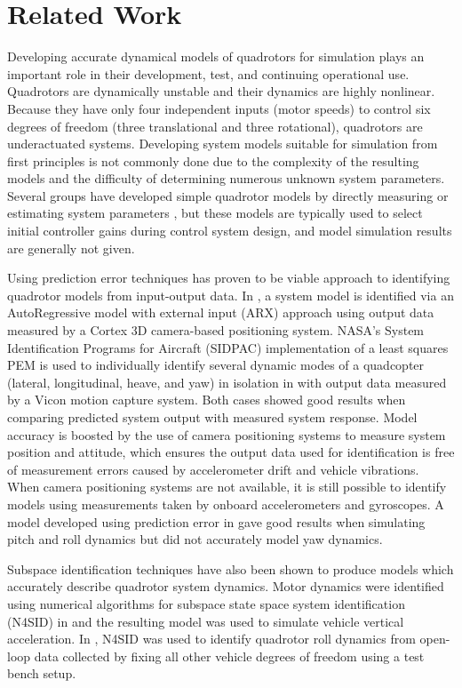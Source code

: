 \section{Related Work}
Developing accurate dynamical models of quadrotors for simulation plays an important role in their development, test, and continuing operational use. Quadrotors are dynamically unstable and their dynamics are highly nonlinear. Because they have only four independent inputs (motor speeds) to control six degrees of freedom (three translational and three rotational), quadrotors are underactuated systems. Developing system models suitable for simulation from first principles is not commonly done due to the complexity of the resulting models and the difficulty of determining numerous unknown system parameters. Several groups have developed simple quadrotor models by directly measuring or estimating system parameters \cite{bresciani2008modelling, domingues2009quadrotor, kivrak2006design, pounds2006modelling, schreier2012modeling}, but these models are typically used to select initial controller gains during control system design, and model simulation results are generally not given. 

Using prediction error techniques has proven to be viable approach to identifying quadrotor models from input-output data. In \cite{chamberlain2011system}, a system model is identified via an AutoRegressive model with external input (ARX) approach using output data measured by a Cortex 3D camera-based positioning system. NASA's System Identification Programs for Aircraft (SIDPAC) implementation of a least squares PEM is used to individually identify several dynamic modes of a quadcopter (lateral, longitudinal, heave, and yaw) in isolation in \cite{miller2011open} with output data measured by a Vicon motion capture system. Both cases showed good results when comparing predicted system output with measured system response. Model accuracy is boosted by the use of camera positioning systems to measure system position and attitude, which ensures the output data used for identification is free of measurement errors caused by accelerometer drift and vehicle vibrations. When camera positioning systems are not available, it is still possible to identify models using measurements taken by onboard accelerometers and gyroscopes.  A model developed using prediction error in \cite{lee2011attitude} gave good results when simulating pitch and roll dynamics but did not accurately model yaw dynamics.

Subspace identification techniques have also been shown to produce models which accurately describe quadrotor system dynamics. Motor dynamics were identified using numerical algorithms for subspace state space system identification (N4SID) in \cite{kis2011sensor} and the resulting model was used to simulate vehicle vertical acceleration. In \cite{batmazdesign}, N4SID was used to identify quadrotor roll dynamics from open-loop data collected by fixing all other vehicle degrees of freedom using a test bench setup. 


